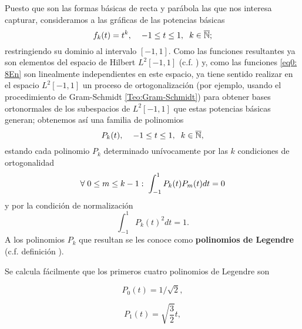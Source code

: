 \begin{comment}
Nuestro acercamiento es como sigue:
\end{comment}
Puesto que son las
formas básicas de recta y parábola las que nos interesa
capturar,
consideramos a las gráficas de las potencias básicas
\begin{equation}
\label{eq0: 8En}
f_{k}(t)= t^{k}, \hspace{0.4cm}
-1 \leq t \leq 1, \hspace{0.2cm}
 k \in \overline{\mathbb{N}};
\end{equation}
restringiendo su dominio al intervalo $[-1,1]$.
Como las funciones
resultantes ya son elementos del 
espacio de Hilbert $L^{2}[-1,1]$ (c.f. )
y, como las funciones \eqref{eq0: 8En} son linealmente
independientes en este espacio, ya tiene sentido realizar
en el espacio $L^{2}[-1,1]$  un proceso de ortogonalización
(por ejemplo, usando el procedimiento de Gram-Schmidt 
\ref{Teo:Gram-Schmidt}) para obtener bases ortonormales
de los subespacios de $L^{2}[-1,1]$ que estas potencias
básicas generan; obtenemos así una familia de polinomios 
\begin{equation}
\label{eq1: 8En}
P_{k}(t), \hspace{0.4cm}
-1 \leq t \leq 1, \hspace{0.2cm}
 k \in \overline{\mathbb{N}},
\end{equation}
estando cada polinomio $P_{k}$ determinado unívocamente
por las $k$ condiciones de ortogonalidad
\[
\forall \hspace{0.1cm} 0 \leq m \leq k-1: \hspace{0.1cm}
\int_{-1}^{1}{P_{k}(t)P_{m}(t)} dt = 0
\]
y por la condición de normalización 
\[
\int_{-1}^{1}{P_{k}(t)^{2}} dt = 1.
\]
A los polinomios $P_{k}$ que resultan
se les conoce como \textbf{polinomios de Legendre}
 (c.f. definición ).

Se calcula fácilmente que los primeros cuatro 
polinomios de Legendre son

\[
P_{0}(t) = 1/\sqrt{2},
\]

\[
P_{1}(t) = \sqrt{\frac{3}{2}}t,
\]

